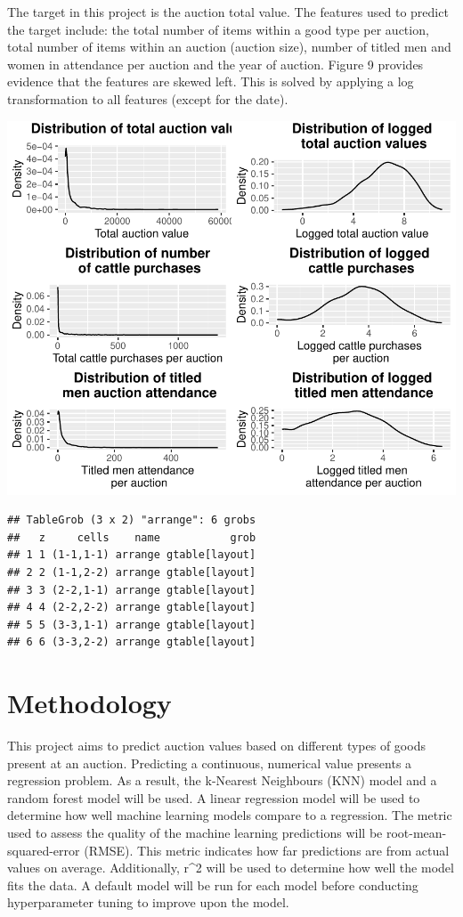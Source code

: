 \documentclass[11pt,preprint, authoryear]{elsarticle}
\numberwithin{equation}{section}
\numberwithin{figure}{section}
\numberwithin{table}{section}
\begin{document}
The target in this project is the auction total value. The features used
to predict the target include: the total number of items within a good
type per auction, total number of items within an auction (auction
size), number of titled men and women in attendance per auction and the
year of auction. Figure 9 provides evidence that the features are skewed
left. This is solved by applying a log transformation to all features
(except for the date).

\includegraphics{Project_write_up_files/figure-latex/Figure9-1.pdf}

\begin{verbatim}
## TableGrob (3 x 2) "arrange": 6 grobs
##   z     cells    name           grob
## 1 1 (1-1,1-1) arrange gtable[layout]
## 2 2 (1-1,2-2) arrange gtable[layout]
## 3 3 (2-2,1-1) arrange gtable[layout]
## 4 4 (2-2,2-2) arrange gtable[layout]
## 5 5 (3-3,1-1) arrange gtable[layout]
## 6 6 (3-3,2-2) arrange gtable[layout]
\end{verbatim}

\hypertarget{methodology}{%
\section{Methodology}\label{methodology}}

This project aims to predict auction values based on different types of
goods present at an auction. Predicting a continuous, numerical value
presents a regression problem. As a result, the k-Nearest Neighbours
(KNN) model and a random forest model will be used. A linear regression
model will be used to determine how well machine learning models compare
to a regression. The metric used to assess the quality of the machine
learning predictions will be root-mean-squared-error (RMSE). This metric
indicates how far predictions are from actual values on average.
Additionally, r\^{}2 will be used to determine how well the model fits
the data. A default model will be run for each model before conducting
hyperparameter tuning to improve upon the model.
\end{document}
